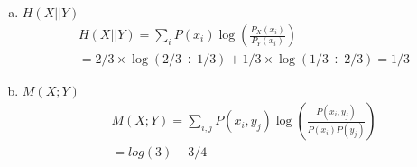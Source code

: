 \documentclass[12pt]{article}
\begin{document}
\begin{flushleft}
\begin{enumerate}[(a)]
    \item $H(X || Y)$
    \begin{align*}
        & H(X || Y) = \sum_i P(x_i) \log(\frac{P_X(x_i)}{P_Y(x_i)}) \\
        & = 2/3 \times \log(2/3 \div 1/3) + 1/3 \times \log(1/3 \div 2/3) = 1/3
    \end{align*}
    \item $M(X;Y)$
    \begin{align*}
        & M(X;Y) = \sum_{i,j} P(x_i, y_j) \log(\frac{P(x_i,y_j)}{P(x_i) P(y_j)}) \\
        & = log(3) - 3/4
    \end{align*}
\end{enumerate}
\end{flushleft}
\end{document}
